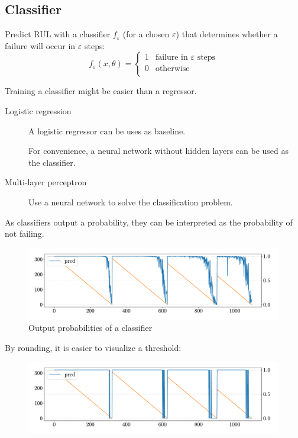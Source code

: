 \subsection{Classifier} \label{sec:rul_classifier_naive}

Predict RUL with a classifier $f_\varepsilon$ (for a chosen $\varepsilon$) that determines whether a failure will occur in $\varepsilon$ steps:
\[ f_\varepsilon(x, \theta) = \begin{cases}
    1 & \text{failure in $\varepsilon$ steps} \\
    0 & \text{otherwise} \\
\end{cases} \]

\begin{remark}
    Training a classifier might be easier than a regressor.
\end{remark}

\begin{description}
    \item[Logistic regression] 
        A logistic regressor can be uses as baseline.

        \begin{remark}
            For convenience, a neural network without hidden layers can be used as the classifier.
        \end{remark}

    \item[Multi-layer perceptron]
        Use a neural network to solve the classification problem.
\end{description}

\begin{remark}
    As classifiers output a probability, they can be interpreted as the probability of not failing.
    \begin{figure}[H]
        \centering
        \includegraphics[width=0.7\linewidth]{./img/_rul_classification_predictions.pdf}
        \caption{Output probabilities of a classifier}
    \end{figure}
    By rounding, it is easier to visualize a threshold:
    \begin{figure}[H]
        \centering
        \includegraphics[width=0.7\linewidth]{./img/_rul_classification_rounding.pdf}
    \end{figure}
\end{remark}

